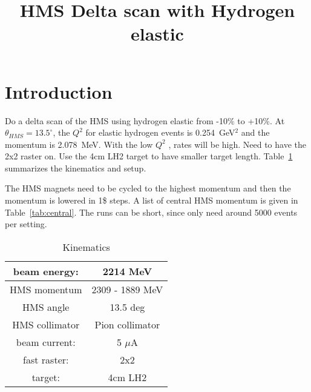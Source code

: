 \documentclass[]{article}
\title{HMS Delta scan with Hydrogen elastic}
\begin{document}
\maketitle


\section{Introduction}

Do a delta scan of the HMS using hydrogen elastic from -10\% to +10\%.
At $\theta_{HMS} = 13.5^{\circ}$, the $Q^2$ for elastic
hydrogen events is 0.254~GeV$^2$ and the momentum is 2.078~MeV.
With the low $Q^2$ , rates will be high. 
Need to have the 2x2 raster on. Use the 4cm LH2 target
to have smaller target length. Table~\ref{tab:kin}
summarizes the kinematics and setup.

The HMS magnets need to be cycled to the highest momentum
and then the momentum is lowered in 1\$ steps. A list of central
HMS momentum is given in Table~\ref{tab:central}. The runs
can be short, since only need around 5000 events per setting.

\begin{table}[h]
	\begin{center}
		\begin{tabular}[]{|c|c|} \hline\hline
			beam energy: & 2214 MeV\\ \hline
			HMS momentum & 2309 - 1889 MeV \\ \hline
			HMS angle & 13.5 deg \\ \hline
			HMS collimator & Pion collimator \\ \hline
			beam current: & 5 $\mu$A\\ \hline
			fast raster: & 2x2\\ \hline
			target: & 4cm LH2\\ \hline
		\end{tabular}
		\caption{Kinematics}
		\label{tab:kin}
	\end{center}
\end{table}
	
\end{document}
